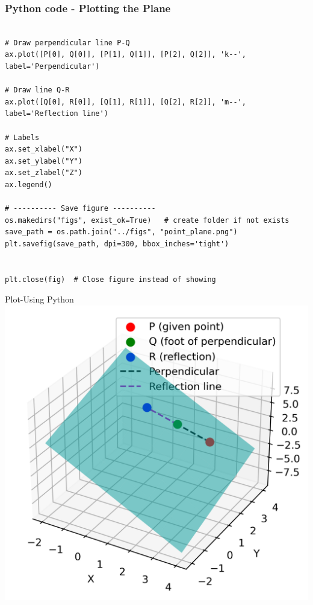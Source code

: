 \documentclass{beamer}
\begin{document}
\begin{frame}[fragile]                            
\frametitle{Python code - Plotting the Plane}                
\begin{lstlisting}

# Draw perpendicular line P-Q
ax.plot([P[0], Q[0]], [P[1], Q[1]], [P[2], Q[2]], 'k--', label='Perpendicular')

# Draw line Q-R
ax.plot([Q[0], R[0]], [Q[1], R[1]], [Q[2], R[2]], 'm--', label='Reflection line')

# Labels
ax.set_xlabel("X")
ax.set_ylabel("Y")
ax.set_zlabel("Z")
ax.legend()

# ---------- Save figure ----------
os.makedirs("figs", exist_ok=True)   # create folder if not exists
save_path = os.path.join("../figs", "point_plane.png")
plt.savefig(save_path, dpi=300, bbox_inches='tight')


plt.close(fig)  # Close figure instead of showing
\end{lstlisting}

\end{frame}
\begin{frame}{Plot-Using  Python}
    \centering
    \includegraphics[width=\columnwidth, height=0.8\textheight, keepaspectratio]{../figs/point_plane.png}     

\end{frame}
\end{document}
